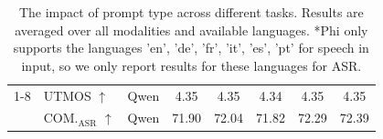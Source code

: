 \begin{table}[]
\begin{tabular}{llcccccc}
     \cmidrule(lr){1-8}
     \multirow{2}{*}{\textbf{S2ST}} & UTMOS $\uparrow$ & Qwen & \cellcolor{taskgreen!69} 4.35 & \cellcolor{taskgreen!80} 4.35 & \cellcolor{taskgreen!20} 4.34 & \cellcolor{taskgreen!44} 4.35 & \cellcolor{taskgreen!56} 4.35 \\
      & COM.$_{\text{ASR}}$ $\uparrow$ & Qwen & \cellcolor{taskgreen!28} 71.90 & \cellcolor{taskgreen!44} 72.04 & \cellcolor{taskgreen!20} 71.82 & \cellcolor{taskgreen!69} 72.29 & \cellcolor{taskgreen!80} 72.39 \\
     \bottomrule
    \end{tabular}
    \caption{The impact of prompt type across different tasks. Results are averaged over all modalities and available languages. *Phi only supports the languages 'en', 'de', 'fr', 'it', 'es', 'pt' for speech in input, so we only report results for these languages for ASR.}
    \label{tab:prompt_type}
\end{table}